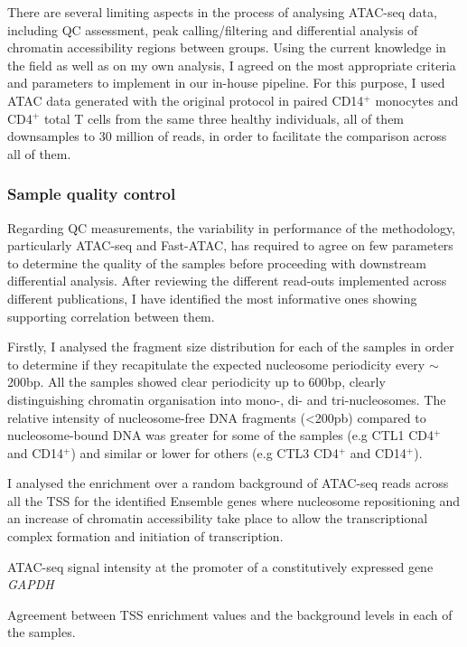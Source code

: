 There are several limiting aspects in the process of analysing ATAC-seq data, including QC assessment, peak calling/filtering and differential analysis of chromatin accessibility regions between groups. Using the current knowledge in the field as well as on my own analysis, I agreed on the most appropriate criteria and parameters to implement in our in-house pipeline. For this purpose, I used ATAC data generated with the original protocol \parencite{Buenrostro2013} in paired CD14$^+$ monocytes and CD4$^+$ total T cells from the same three healthy individuals, all of them downsamples to 30 million of reads, in order to facilitate the comparison across all of them.

\subsubsection{Sample quality control}
Regarding QC measurements, the variability in performance of the methodology, particularly ATAC-seq and Fast-ATAC, has required to agree on few parameters to determine the quality of the samples before proceeding with downstream differential analysis. After reviewing the different read-outs implemented across different publications, I have identified the most informative ones showing supporting correlation between them.

Firstly, I analysed the fragment size distribution for each of the samples in order to determine if they recapitulate the expected nucleosome periodicity every $\sim$200bp. All the samples showed clear periodicity up to 600bp, clearly distinguishing chromatin organisation into mono-, di- and tri-nucleosomes. The relative intensity of nucleosome-free DNA fragments (<200pb) compared to nucleosome-bound DNA was greater for some of the samples (e.g CTL1 CD4$^+$ and CD14$^+$) and similar or lower for others (e.g CTL3 CD4$^+$ and CD14$^+$).


I analysed the enrichment over a random background of ATAC-seq reads across all the TSS for the identified Ensemble genes where nucleosome repositioning and an increase of chromatin accessibility take place to allow the transcriptional complex formation and initiation of transcription.


ATAC-seq signal intensity at the promoter of a constitutively expressed gene \textit{GAPDH}

Agreement between TSS enrichment values and the background levels in each of the samples.







